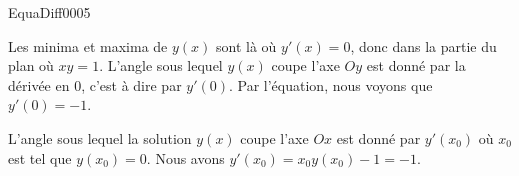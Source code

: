 \begin{corrige}{EquaDiff0005}

Les minima et maxima de $y(x)$ sont là où $y'(x)=0$, donc dans la partie du plan où $xy=1$. L'angle sous lequel $y(x)$ coupe l'axe $Oy$ est donné par la dérivée en $0$, c'est à dire par $y'(0)$. Par l'équation, nous voyons que $y'(0)=-1$.

L'angle sous lequel la solution $y(x)$ coupe l'axe $Ox$ est donné par $y'(x_0)$ où $x_0$ est tel que $y(x_0)=0$. Nous avons $y'(x_0)=x_0y(x_0)-1=-1$.

\end{corrige}
